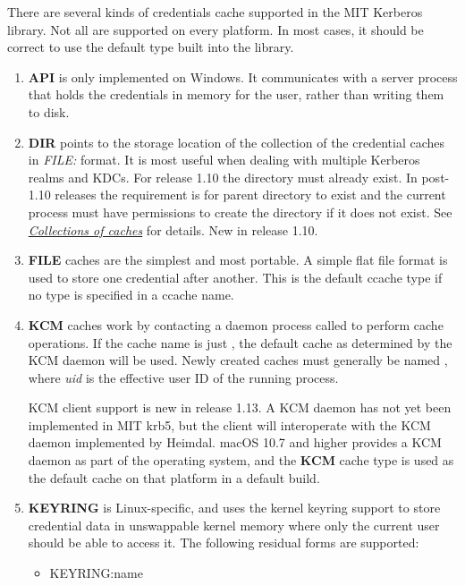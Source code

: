 \documentclass[letterpaper,10pt,english]{sphinxmanual}
\begin{document}
There are several kinds of credentials cache supported in the MIT
Kerberos library.  Not all are supported on every platform.  In most
cases, it should be correct to use the default type built into the
library.
\begin{enumerate}
\item {} 
\textbf{API} is only implemented on Windows.  It communicates with a
server process that holds the credentials in memory for the user,
rather than writing them to disk.

\item {} 
\textbf{DIR} points to the storage location of the collection of the
credential caches in \emph{FILE:} format. It is most useful when dealing
with multiple Kerberos realms and KDCs.  For release 1.10 the
directory must already exist.  In post-1.10 releases the
requirement is for parent directory to exist and the current
process must have permissions to create the directory if it does
not exist. See {\hyperref[basic/ccache_def:col-ccache]{\emph{Collections of caches}}} for details.  New in release 1.10.

\item {} 
\textbf{FILE} caches are the simplest and most portable. A simple flat
file format is used to store one credential after another.  This is
the default ccache type if no type is specified in a ccache name.

\item {} 
\textbf{KCM} caches work by contacting a daemon process called 
to perform cache operations.  If the cache name is just ,
the default cache as determined by the KCM daemon will be used.
Newly created caches must generally be named ,
where \emph{uid} is the effective user ID of the running process.

KCM client support is new in release 1.13.  A KCM daemon has not
yet been implemented in MIT krb5, but the client will interoperate
with the KCM daemon implemented by Heimdal.  macOS 10.7 and higher
provides a KCM daemon as part of the operating system, and the
\textbf{KCM} cache type is used as the default cache on that platform in
a default build.

\item {} 
\textbf{KEYRING} is Linux-specific, and uses the kernel keyring support
to store credential data in unswappable kernel memory where only
the current user should be able to access it.  The following
residual forms are supported:
\begin{itemize}
\item {} 
KEYRING:name


\end{itemize}
\end{enumerate}
\end{document}
